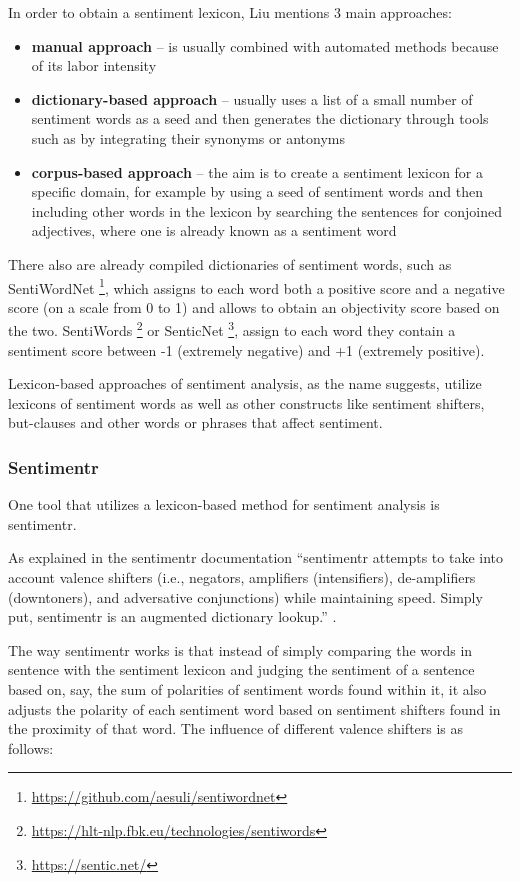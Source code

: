   
  In order to obtain a sentiment lexicon, Liu \cite{liu_2015} mentions 3 main approaches:
  \begin{itemize}
      \item \textbf{manual approach} -- is usually combined with automated methods because of its labor intensity
      \item \textbf{dictionary-based approach} -- usually uses a list of a small number of sentiment words as a seed and then generates the dictionary through tools such as \textcite{wordnet}   by integrating their synonyms or antonyms
      \item \textbf{corpus-based approach} -- the aim is to create a sentiment lexicon for a specific domain, for example by using a seed of sentiment words and then including other words in the lexicon by searching the sentences for conjoined adjectives, where one is already known as a sentiment word
  \end{itemize}
  There also are already compiled dictionaries of sentiment words, such as SentiWordNet \footnote{\url{https://github.com/aesuli/sentiwordnet}}, which assigns to each word both a positive score and a negative score (on a scale from 0 to 1) and allows to obtain an objectivity score based on the two. SentiWords \footnote{\url{https://hlt-nlp.fbk.eu/technologies/sentiwords}} or SenticNet \footnote{\url{https://sentic.net/}}, assign to each word they contain a sentiment score between -1 (extremely negative) and +1 (extremely positive).
  
  Lexicon-based approaches of sentiment analysis, as the name suggests, utilize lexicons of sentiment words as well as other constructs like sentiment shifters, but-clauses and other words or phrases that affect sentiment.
\subsubsection{Sentimentr}
One tool that utilizes a lexicon-based method for sentiment analysis is sentimentr.

 As explained in the sentimentr documentation ``sentimentr attempts to take into account valence shifters (i.e., negators, amplifiers (intensifiers), de-amplifiers (downtoners), and adversative conjunctions) while maintaining speed. Simply put, sentimentr is an augmented dictionary lookup.'' \cite{sentimentr}.
 
The way sentimentr works is that instead of simply comparing the words in sentence with the sentiment lexicon and judging the sentiment of a sentence based on, say, the sum of polarities of sentiment words found within it, it also adjusts the polarity of each sentiment word based on sentiment shifters found in the proximity of that word. The influence of different valence shifters is as follows:

